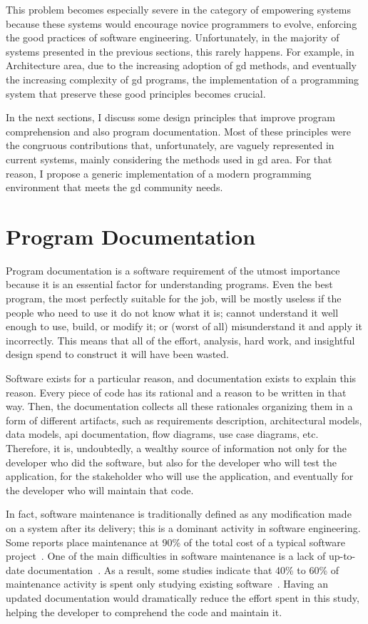 This problem becomes especially severe in the category of empowering systems because these systems would encourage novice programmers to evolve, enforcing the good practices of software engineering. Unfortunately, in the majority of systems presented in the previous sections, this rarely happens. For example, in Architecture area, due to the increasing adoption of \gls{gd} methods, and eventually the increasing complexity of \gls{gd} programs, the implementation of a programming system that preserve these good principles becomes crucial.

In the next sections, I discuss some design principles that improve program comprehension and also program documentation. Most of these principles were the congruous contributions that, unfortunately, are vaguely represented in current systems, mainly considering the methods used in \gls{gd} area. For that reason, I propose a generic implementation of a modern programming environment that meets the \gls{gd} community needs.

\section{Program Documentation}

Program documentation is a software requirement of the utmost importance because it is an essential factor for understanding programs. Even the best program, the most perfectly suitable for the job, will be mostly useless if the people who need to use it do not know what it is; cannot understand it well enough to use, build, or modify it; or (worst of all) misunderstand it and apply it incorrectly. This means that all of the effort, analysis, hard work, and insightful design spend to construct it will have been wasted.

Software exists for a particular reason, and documentation exists to explain this reason. Every piece of code has its rational and a reason to be written in that way. Then, the documentation collects all these rationales organizing them in a form of different artifacts, such as requirements description, architectural models, data models, \gls{api} documentation, flow diagrams, use case diagrams, etc. Therefore, it is, undoubtedly, a wealthy source of information not only for the developer who did the software, but also for the developer who will test the application, for the stakeholder who will use the application, and eventually for the developer who will maintain that code.

In fact, software maintenance is traditionally defined as any modification made on a system after its delivery; this is a dominant activity in software engineering. Some reports place maintenance at 90\% of the total cost of a typical software project~\citep{seacord2003modernizing,pigoski1996practical}. One of the main difficulties in software maintenance is a lack of up-to-date documentation~\citep{de2005study}. As a result, some studies indicate that 40\% to 60\% of maintenance activity is spent only studying existing software~\citep[p. 475 and p. 35 respectively]{pigoski1996practical,pfleeger1998software}. Having an updated documentation would dramatically reduce the effort spent in this study, helping the developer to comprehend the code and maintain it.

